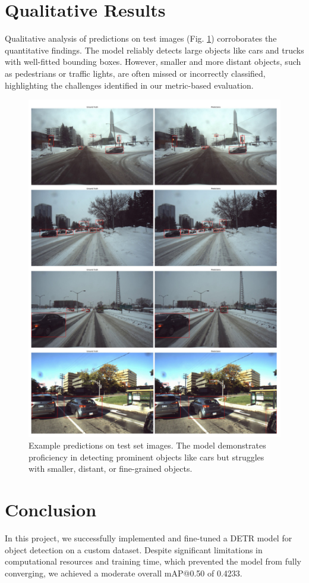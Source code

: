 \documentclass[10pt, conference]{IEEEtran}
\begin{document}
\section{Qualitative Results}
Qualitative analysis of predictions on test images (Fig. \ref{fig:predictions}) corroborates the quantitative findings. The model reliably detects large objects like cars and trucks with well-fitted bounding boxes. However, smaller and more distant objects, such as pedestrians or traffic lights, are often missed or incorrectly classified, highlighting the challenges identified in our metric-based evaluation.

\begin{figure}[h]
    \centering
    \includegraphics[width=0.9\linewidth]{images/predictions.png}
    \caption{Example predictions on test set images. The model demonstrates proficiency in detecting prominent objects like cars but struggles with smaller, distant, or fine-grained objects.}
    \label{fig:predictions}
\end{figure}
 

\section{Conclusion}
In this project, we successfully implemented and fine-tuned a DETR model for object detection on a custom dataset. Despite significant limitations in computational resources and training time, which prevented the model from fully converging, we achieved a moderate overall mAP@0.50 of 0.4233.
\end{document}
